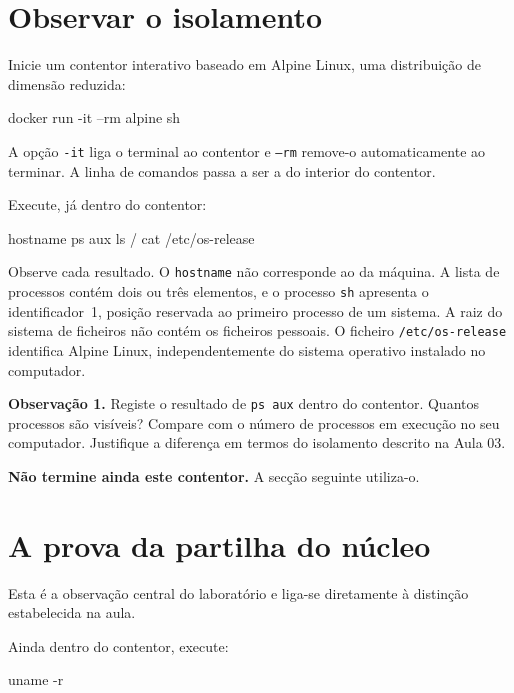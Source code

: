 \documentclass[11pt,a4paper]{article}
\begin{document}
\section{Observar o isolamento}

Inicie um contentor interativo baseado em Alpine Linux, uma distribuição de dimensão reduzida:

\begin{terminal}
docker run -it --rm alpine sh
\end{terminal}

A opção \texttt{-it} liga o terminal ao contentor e \texttt{--rm} remove-o automaticamente ao terminar. A linha de comandos passa a ser a do interior do contentor.

Execute, já dentro do contentor:

\begin{terminal}
hostname
ps aux
ls /
cat /etc/os-release
\end{terminal}

Observe cada resultado. O \texttt{hostname} não corresponde ao da máquina. A lista de processos contém dois ou três elementos, e o processo \texttt{sh} apresenta o identificador~1, posição reservada ao primeiro processo de um sistema. A raiz do sistema de ficheiros não contém os ficheiros pessoais. O ficheiro \texttt{/etc/os-release} identifica Alpine Linux, independentemente do sistema operativo instalado no computador.

\begin{registo}
\textbf{Observação 1.} Registe o resultado de \texttt{ps aux} dentro do contentor. Quantos processos são visíveis? Compare com o número de processos em execução no seu computador. Justifique a diferença em termos do isolamento descrito na Aula 03.
\end{registo}

\textbf{Não termine ainda este contentor.} A secção seguinte utiliza-o.

\section{A prova da partilha do núcleo}

Esta é a observação central do laboratório e liga-se diretamente à distinção estabelecida na aula.

Ainda dentro do contentor, execute:

\begin{terminal}
uname -r
\end{terminal}
\end{document}
